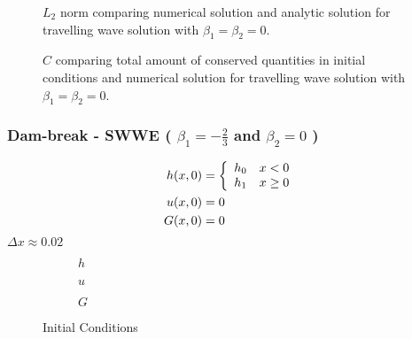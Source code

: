 \documentclass[10pt]{article}
\begin{document}
\begin{figure}
	\centering
	
	\caption{$L_2$ norm comparing numerical solution and analytic solution for travelling wave solution with $\beta_1 = \beta_2 = 0$. }
\end{figure}

\begin{figure}
	\centering
	
	\caption{$C$ comparing total amount of conserved quantities in initial conditions and numerical solution for travelling wave solution with $\beta_1 = \beta_2 = 0$. }
\end{figure}


\subsubsection{Dam-break - SWWE ( $\beta_1= -\frac{2}{3}$ and $ \beta_2 =0$ ) }
\begin{align}
h(x,0) & = \left\lbrace \begin{array}{c c}
h_0 & x < 0\\
h_1 & x \ge 0
\end{array} \right.  \\
u(x,0) &= 0 \\
G(x,0) &= 0
\end{align}
$\Delta x \approx 0.02$
\begin{figure}
	\centering
	\begin{subfigure}{0.3\textwidth}
		\centering
		
		\caption{$h$}
	\end{subfigure}
	\begin{subfigure}{0.3\textwidth}
		\centering
		
		\caption{$u$}
	\end{subfigure}
	\begin{subfigure}{0.3\textwidth}
		\centering
		
		\caption{$G$}
	\end{subfigure}
	\caption{Initial Conditions}
\end{figure}
\end{document}
